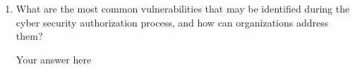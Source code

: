 \documentclass[11pt,letterpaper]{article}
\newenvironment{answer}{\em \color{blue} \begin{adjustwidth}{1cm}{1cm}}{\end{adjustwidth}}
\begin{document}
\begin{enumerate}
		\begin{answer}
			Your answer here
		\end{answer}
		
		\item What are the most common vulnerabilities that may be identified during the cyber security authorization process, and how can organizations address them?
		
		\begin{answer}
			Your answer here
		\end{answer}
		
	\end{enumerate}
	
\end{document}
